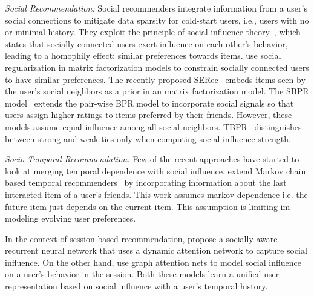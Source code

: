 \noindent
\emph{Social Recommendation:}
Social recommenders integrate information from a user's social connections to mitigate data sparsity for cold-start users, i.e., users with no or minimal history. They exploit the principle of social influence theory~\cite{Tang:2009}, which states that socially connected users exert influence on each other's behavior, leading to a homophily effect: similar preferences towards items. \citet{SocialMF, SoReg} use social regularization in matrix factorization models to constrain socially connected users to have similar preferences. The recently proposed SERec~\cite{SERec} embeds items seen by the user's social neighbors as a prior in an matrix factorization model. The SBPR model~\cite{SBPR} extends the pair-wise BPR model to incorporate social signals so that users assign higher ratings to items preferred by their friends. However, these models assume equal influence among all social neighbors. TBPR~\cite{TBPR} distinguishes between strong and weak ties only when computing social influence strength.

\noindent
\emph{Socio-Temporal Recommendation:}
Few of the recent approaches have started to look at merging temporal dependence with social influence. \citet{Cai:2017} extend Markov chain based temporal recommenders~\cite{Rendle2} by incorporating information about the last interacted item of a user's friends. This work assumes markov dependence i.e. the future item just depends on the current item. This assumption is limiting im modeling evolving user preferences.

In the context of session-based recommendation, \citet{Sun:2018} propose a socially aware recurrent neural network that uses a dynamic attention network to capture social influence. On the other hand, \citet{Song:2019} use graph attention nets to model social influence on a user's behavior in the session. Both these models learn a unified user representation based on social influence with a user's temporal history.
